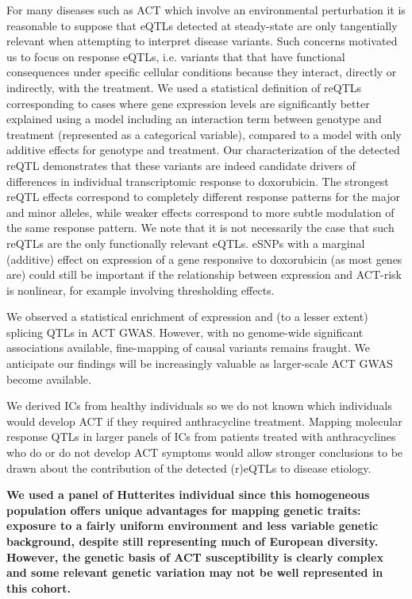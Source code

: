 \documentclass{article}
\newcommand{\tempbold}[1]{\textbf{#1}}
\begin{document}
For many diseases such as ACT which involve an environmental perturbation it is reasonable to suppose that eQTLs detected at steady-state are only tangentially relevant when attempting to interpret disease variants.
Such concerns motivated us to focus on response eQTLs, i.e. variants that that have functional consequences under specific cellular conditions because they interact, directly or indirectly, with the treatment.
We used a statistical definition of reQTLs corresponding to cases where gene expression levels are significantly better explained using a model including an interaction term between genotype and treatment (represented as a categorical variable), compared to a model with only additive effects for genotype and treatment. 
Our characterization of the detected reQTL demonstrates that these variants are indeed candidate drivers of differences in individual transcriptomic response to doxorubicin. The strongest reQTL effects correspond to completely different response patterns for the major and minor alleles, while weaker effects correspond to more subtle modulation of the same response pattern. 
We note that it is not necessarily the case that such reQTLs are the only functionally relevant eQTLs. eSNPs with a marginal (additive) effect on expression of a gene responsive to doxorubicin (as most genes are) could still be important if the relationship between expression and ACT-risk is nonlinear, for example involving thresholding effects. 

We observed a statistical enrichment of expression and (to a lesser extent) splicing QTLs in ACT GWAS. However, with no genome-wide significant associations available, fine-mapping of causal variants remains fraught. We anticipate our findings will be increasingly valuable as larger-scale ACT GWAS become available. 

We derived ICs from healthy individuals so we do not known which individuals would develop ACT if they required anthracycline treatment. Mapping molecular response QTLs in larger panels of ICs from patients treated with anthracyclines who do or do not develop ACT symptoms would allow stronger conclusions to be drawn about the contribution of the detected (r)eQTLs to disease etiology. 

\tempbold{We used a panel of Hutterites individual since this homogeneous population offers unique advantages for mapping genetic traits: exposure to a fairly uniform environment and less variable genetic background, despite still representing much of European diversity\cite{Newman2004-ms}. However, the genetic basis of ACT susceptibility is clearly complex and some relevant genetic variation may not be well represented in this cohort.}
\end{document}
